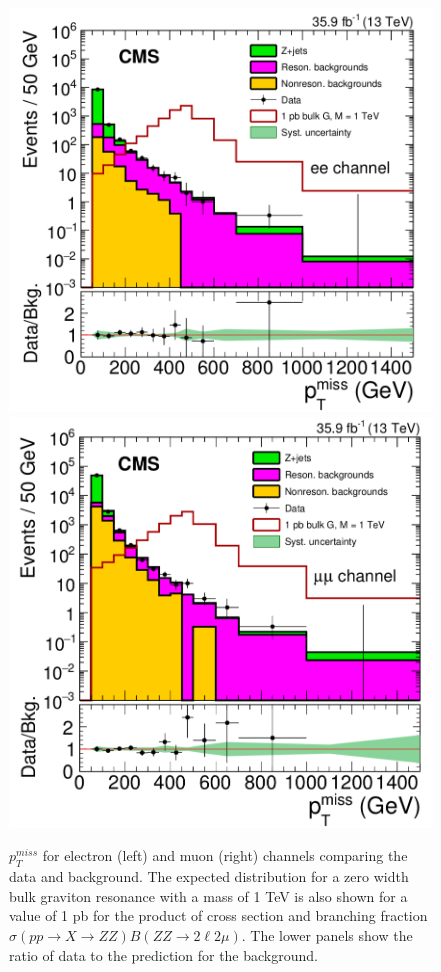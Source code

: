 \begin{figure}[htbp]
\begin{center}
\includegraphics[width=0.49\linewidth]{figures/sys_elSRuncMET.png}
\includegraphics[width=0.49\linewidth]{figures/sys_muSRuncMET.png}
\caption{$p_T ^{miss}$ for electron (left) and muon (right) channels comparing the data and background. The expected distribution for a zero width bulk graviton resonance with a mass of 1 TeV is also shown for a value of 1 pb for the product of cross section and branching fraction $\sigma(pp\rightarrow X\rightarrow ZZ)B(ZZ\rightarrow 2\ell 2\mu)$. The lower panels show the ratio of data to the prediction for the background. }
\label{fig:sys_uncMET}
\end{center}
\end{figure}


